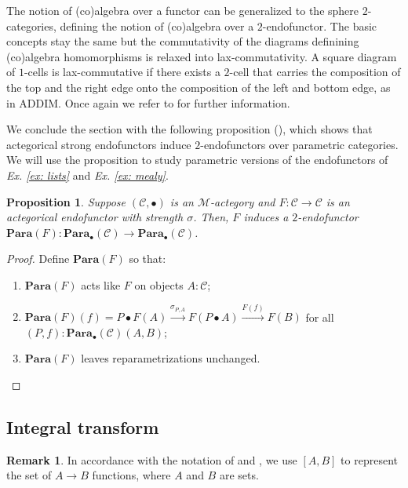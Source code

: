 \documentclass[11pt,a4paper,openright,twoside]{report}
\newcounter{mycounter}
\theoremstyle{plain}
\newtheorem{proposition}[mycounter]{Proposition}
\theoremstyle{definition}
\newtheorem{remark}[mycounter]{Remark}
\begin{document}
The notion of (co)algebra over a functor can be generalized to the sphere $2$-categories, defining the notion of (co)algebra over a $2$-endofunctor. The basic concepts stay the same but the commutativity of the diagrams definining (co)algebra homomorphisms is relaxed into lax-commutativity. A square diagram of $1$-cells is lax-commutative if there exists a $2$-cell that carries the composition of the top and the right edge onto the composition of the left and bottom edge, as in ADDIM. Once again we refer to \cite{gavranovicposition} for further information.


We conclude the section with the following proposition (\cite{gavranovicposition}), which shows that actegorical strong endofunctors induce $2$-endofunctors over parametric categories. We will use the proposition to study parametric versions of the endofunctors of \textit{Ex. \ref{ex: lists}} and \textit{Ex. \ref{ex: mealy}}.

\begin{proposition}
  \label{prop: paraend}
  Suppose $(\mathcal{C}, \bullet)$ is an $\mathcal{M}$-actegory and $F: \mathcal{C} \to \mathcal{C}$ is an actegorical endofunctor with strength $\sigma$. Then, $F$ induces a  $2$-endofunctor $\mathbf{Para}(F): \mathbf{Para}_{\bullet}(\mathcal{C}) \to \mathbf{Para}_{\bullet}(\mathcal{C})$.
\end{proposition}
\begin{proof}
  Define $\mathbf{Para}(F)$ so that: 
  \begin{enumerate}
    \item $\mathbf{Para}(F)$ acts like $F$ on objects $A: \mathcal{C}$;
    \item $\mathbf{Para}(F)(f) = P \bullet F(A) \stackrel{\sigma_{P,A}}{\longrightarrow} F(P \bullet A) \stackrel{F(f)}{\longrightarrow} F(B)$ for all $(P,f):\mathbf{Para}_{\bullet}(\mathcal{C})(A,B)$;
    \item $\mathbf{Para}(F)$ leaves reparametrizations unchanged.
  \end{enumerate}
\end{proof}


\subsection{Integral transform}

\begin{remark}
  In accordance with the notation of \cite{dudzik2022graph} and \cite{dudzik2024asynchronous}, we use $[A,B]$ to represent the set of $A \to B$ functions, where $A$ and $B$ are sets.
\end{remark}
\end{document}

